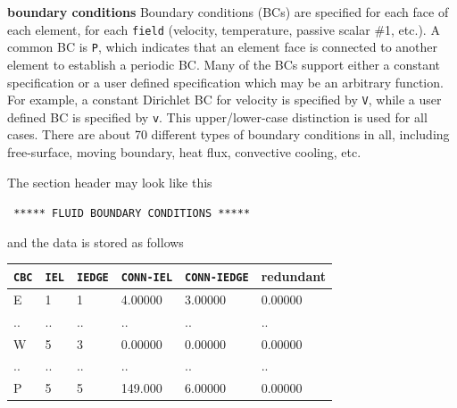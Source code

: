 \begin{description}
\item{\bf boundary conditions} 
     Boundary conditions (BCs) are specified for each face of each element,
     for each {\tt field} (velocity, temperature, passive scalar \#1, etc.).
     A common BC is {\tt P}, which indicates that an element face is 
     connected to another element to establish a periodic BC.   Many of the 
     BCs support either a constant specification or a user defined
     specification which
     may be an arbitrary function.   For example, a constant Dirichlet
     BC for velocity is specified by {\tt V}, while a user defined BC
     is specified by {\tt v}.   This upper/lower-case distinction is 
     used for all cases.   There are about 70 different types of boundary
     conditions in all, including free-surface, moving boundary, heat flux,
     convective cooling, etc.
     
      The section header may look like this 
     \begin{center}
     \texttt{ ***** FLUID   BOUNDARY CONDITIONS *****}

     \end{center}
     and the data is stored as follows
      \footnotesize   
     \begin{center}
\begin{tabular}{ l|l|l|l|l|l }
   \hline
 \texttt{CBC}& \texttt{IEL} &\texttt{IEDGE} &\texttt{CONN-IEL}&\texttt{CONN-IEDGE} & redundant\\ \hline \hline
  E   & 1 & 1 &  4.00000   &    3.00000  &     0.00000      \\
   ..   & .. & .. &  ..   &   .. &    ..      \\
   W  &  5 & 3 &  0.00000  &     0.00000  &     0.00000    \\
    ..   & .. & .. & ..   &   ..  &    ..      \\
   P  &  5 & 5  & 149.000 &      6.00000  &     0.00000 \\
   \hline
\end{tabular}   
\end{center}
\normalsize
     
\end{description}

